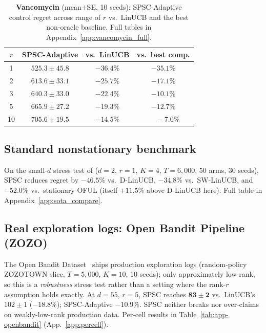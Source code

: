 \documentclass{article}
\begin{document}
\begin{table}[!htbp]
\centering
\caption{\textbf{Vancomycin} (mean$\pm$SE, 10 seeds): SPSC-Adaptive
control regret across range of $r$ vs.\ LinUCB and the best
non-oracle baseline. Full tables in
Appendix~\ref{app:vancomycin_full}.}
\label{tab:vancomycin_body}
\small
\setlength{\tabcolsep}{6pt}
\begin{tabular}{cccc}
\toprule
$r$ & SPSC-Adaptive  & vs.\ LinUCB & vs.\ best comp.\\
\midrule
1   & $\mathbf{525.3\pm 45.8}$ & $-36.4\%$ & $-35.1\%$ \\
2   & $\mathbf{613.6\pm 33.1}$ & $-25.7\%$ & $-17.1\%$ \\
3   & $\mathbf{640.3\pm 33.0}$ & $-22.4\%$ & $-10.1\%$ \\
5   & $\mathbf{665.9\pm 27.2}$ & $-19.3\%$ & $-12.7\%$ \\
10  & $\mathbf{705.6\pm 19.5}$ & $-14.5\%$ & $\phantom{-}-7.0\%$ \\
\bottomrule
\end{tabular}
\end{table}

\subsection{Standard nonstationary benchmark}
\label{sec:exp_russac}

On the small-$d$ stress test of \citet{russac2019weighted}
($d{=}2$, $r{=}1$, $K{=}4$, $T{=}6{,}000$, 50 arms, 30 seeds), SPSC
reduces regret by $\mathbf{-46.5\%}$ vs.\ D-LinUCB,
$\mathbf{-34.8\%}$ vs.\ SW-LinUCB, and $\mathbf{-52.0\%}$ vs.\
stationary OFUL (itself
$+11.5\%$ above D-LinUCB here). Full table in
Appendix~\ref{app:sota_compare}.

\subsection{Real exploration logs: Open Bandit Pipeline (ZOZO)}
\label{sec:exp_openbandit}

The Open Bandit Dataset~\citep{saito2020open} ships production
exploration logs (random-policy ZOZOTOWN slice, $T{=}5{,}000$,
$K{=}10$, 10 seeds); only approximately low-rank, so this is a
\emph{robustness} stress test rather than a setting where the rank-$r$
assumption holds exactly. At $d{=}55$, $r{=}5$, SPSC reaches
$\mathbf{83\pm 2}$ vs.\ LinUCB's $102\pm 1$ ($-18.8\%$); SPSC-Adaptive
$-10.9\%$. SPSC neither breaks nor over-claims on weakly-low-rank
production data. Per-cell results in Table~\ref{tab:app-openbandit}
(App.~\ref{app:percell}).
\end{document}

